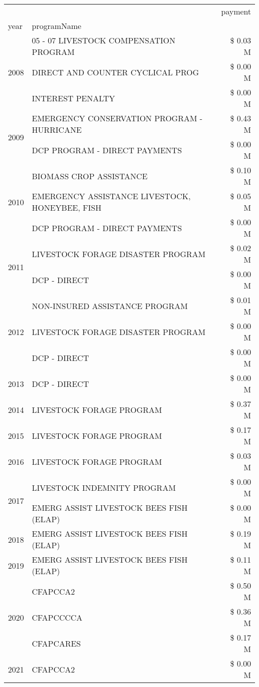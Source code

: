 \begin{tabular}{llr}
\toprule
 &  & payment \\
year & programName &  \\
\midrule
\multirow[t]{3}{*}{2008} & 05 - 07 LIVESTOCK COMPENSATION PROGRAM & \$ 0.03 M \\
 & DIRECT AND COUNTER CYCLICAL PROG & \$ 0.00 M \\
 & INTEREST PENALTY & \$ 0.00 M \\
\cline{1-3}
\multirow[t]{2}{*}{2009} & EMERGENCY CONSERVATION PROGRAM - HURRICANE & \$ 0.43 M \\
 & DCP PROGRAM - DIRECT PAYMENTS & \$ 0.00 M \\
\cline{1-3}
\multirow[t]{3}{*}{2010} & BIOMASS CROP ASSISTANCE & \$ 0.10 M \\
 & EMERGENCY ASSISTANCE LIVESTOCK, HONEYBEE, FISH & \$ 0.05 M \\
 & DCP PROGRAM - DIRECT PAYMENTS & \$ 0.00 M \\
\cline{1-3}
\multirow[t]{2}{*}{2011} & LIVESTOCK FORAGE DISASTER PROGRAM & \$ 0.02 M \\
 & DCP - DIRECT & \$ 0.00 M \\
\cline{1-3}
\multirow[t]{3}{*}{2012} & NON-INSURED ASSISTANCE PROGRAM & \$ 0.01 M \\
 & LIVESTOCK FORAGE DISASTER PROGRAM & \$ 0.00 M \\
 & DCP - DIRECT & \$ 0.00 M \\
\cline{1-3}
2013 & DCP - DIRECT & \$ 0.00 M \\
\cline{1-3}
2014 & LIVESTOCK FORAGE PROGRAM & \$ 0.37 M \\
\cline{1-3}
2015 & LIVESTOCK FORAGE PROGRAM & \$ 0.17 M \\
\cline{1-3}
2016 & LIVESTOCK FORAGE PROGRAM & \$ 0.03 M \\
\cline{1-3}
\multirow[t]{2}{*}{2017} & LIVESTOCK INDEMNITY PROGRAM & \$ 0.00 M \\
 & EMERG ASSIST LIVESTOCK BEES FISH (ELAP) & \$ 0.00 M \\
\cline{1-3}
2018 & EMERG ASSIST LIVESTOCK BEES FISH (ELAP) & \$ 0.19 M \\
\cline{1-3}
2019 & EMERG ASSIST LIVESTOCK BEES FISH (ELAP) & \$ 0.11 M \\
\cline{1-3}
\multirow[t]{3}{*}{2020} & CFAPCCA2 & \$ 0.50 M \\
 & CFAPCCCCA & \$ 0.36 M \\
 & CFAPCARES & \$ 0.17 M \\
\cline{1-3}
2021 & CFAPCCA2 & \$ 0.00 M \\
\cline{1-3}
\bottomrule
\end{tabular}
